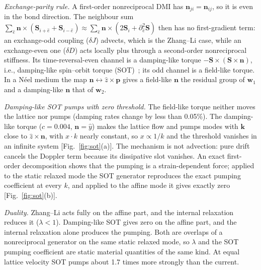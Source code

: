 \documentclass[prb,reprint,amsmath,amssymb,superscriptaddress,floatfix]{revtex4-2}
\newcommand{\wone}{\mathbf w_1}
\newcommand{\wtwo}{\mathbf w_2}
\begin{document}
\textit{Exchange-parity rule.} A first-order nonreciprocal DMI has $\mathbf n_{ji}=\mathbf n_{ij}$, so it is even in the bond direction. The neighbour sum $\sum_{\hat e}\mathbf n\times(\mathbf S_{i+\hat e}+\mathbf S_{i-\hat e})\approx\sum_{\hat e}\mathbf n\times(2\mathbf S_i+\partial_{\hat e}^2\mathbf S)$ then has no first-gradient term: an exchange-odd coupling ($\delta J$) advects, which is the Zhang--Li case, while an exchange-even one ($\delta D$) acts locally plus through a second-order nonreciprocal stiffness. Its time-reversal-even channel is a damping-like torque $-\mathbf S\times(\mathbf S\times\mathbf n)$, i.e., damping-like spin--orbit torque (SOT)~\cite{Manchon2019}; its odd channel is a field-like torque. In a N\'eel medium the map $\mathbf n\leftrightarrow\hat z\times\mathbf p$ gives a field-like $\mathbf n$ the residual group of $\wone$ and a damping-like $\mathbf n$ that of $\wtwo$.

\textit{Damping-like SOT pumps with zero threshold.} The field-like torque neither moves the lattice nor pumps (damping rates change by less than 0.05\%). The damping-like torque ($c=0.004$, $\mathbf n=\hat y$) makes the lattice flow and pumps modes with $\mathbf k$ close to $\hat z\times\mathbf n$, with $x\cdot k$ nearly constant, so $x\propto1/k$ and the threshold vanishes in an infinite system [Fig.~\ref{fig:sot}(a)]. The mechanism is not advection: pure drift cancels the Doppler term because its dissipative slot vanishes. An exact first-order decomposition shows that the pumping is a strain-dependent force; applied to the static relaxed mode the SOT generator reproduces the exact pumping coefficient at every $k$, and applied to the affine mode it gives exactly zero [Fig.~\ref{fig:sot}(b)].

\textit{Duality.} Zhang--Li acts fully on the affine part, and the internal relaxation reduces it ($\lambda<1$). Damping-like SOT gives zero on the affine part, and the internal relaxation alone produces the pumping. Both are overlaps of a nonreciprocal generator on the same static relaxed mode, so $\lambda$ and the SOT pumping coefficient are static material quantities of the same kind. At equal lattice velocity SOT pumps about 1.7 times more strongly than the current.
\end{document}

